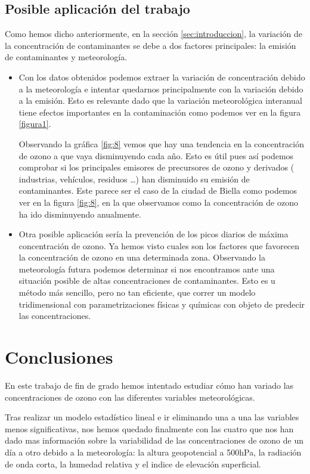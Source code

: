\documentclass[12pt]{article}
\begin{document}
\subsection{Posible aplicación del trabajo}
Como hemos dicho anteriormente, en la sección \ref{sec:introduccion}, la variación de la concentración de contaminantes se debe a dos factores principales: la emisión de contaminantes y  meteorología.
 
 \begin{itemize}
 
 
\item  Con los datos obtenidos podemos extraer la variación de concentración debido a la meteorología e intentar quedarnos principalmente con la variación debido a la emisión. Esto es relevante dado que la variación meteorológica interanual tiene efectos importantes en la contaminación como podemos ver en la figura \ref{figura1}.
 
 Observando la gráfica \ref{fig:8} vemos que hay una  tendencia en la concentración de ozono  a que vaya disminuyendo  cada año.  Esto es útil pues así podemos comprobar si los principales emisores de precursores de ozono y derivados ( industrias, vehículos, residuos \ldots ) han disminuido su emisión de contaminantes. Este parece ser el caso de la ciudad de Biella como podemos ver en la figura \ref{fig:8}, en la que observamos como la concentración de ozono ha ido disminuyendo anualmente.
 
 \item Otra posible aplicación sería la prevención de los picos  diarios de máxima concentración de ozono. Ya hemos visto cuales son los factores que favorecen la concentración de ozono en una determinada zona. Observando la meteorología futura podemos determinar si nos encontramos ante una situación posible de altas concentraciones de contaminantes. Esto es  u método más sencillo, pero no tan eficiente, que  correr un modelo tridimensional con parametrizaciones físicas y químicas con objeto de predecir las concentraciones.
 \end{itemize}
\section{Conclusiones}
En este trabajo de fin de grado hemos intentado estudiar cómo han variado las concentraciones de ozono con  las diferentes variables meteorológicas.


Tras realizar un modelo estadístico lineal e ir eliminando una a una las variables menos significativas, nos hemos quedado finalmente con las cuatro  que nos han dado mas información sobre la variabilidad de las concentraciones de ozono de un día a otro debido a la meteorología: la altura geopotencial a 500hPa, la radiación de onda corta, la humedad relativa y el indice de elevación superficial.
\end{document}
